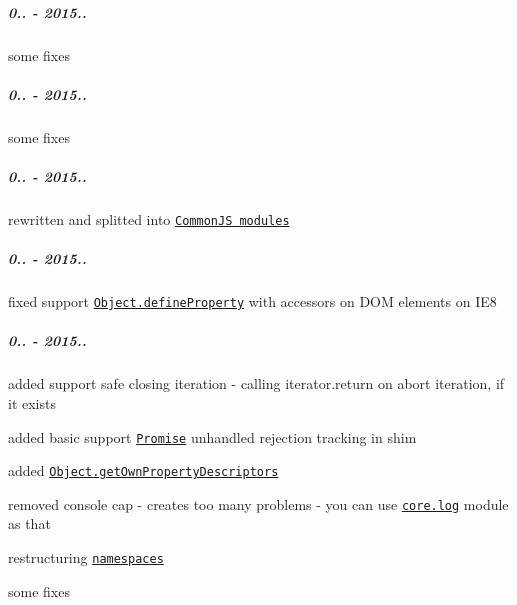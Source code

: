 \subparagraph*{0.. -\/ 2015..}


\begin{DoxyItemize}
\item some fixes
\end{DoxyItemize}

\subparagraph*{0.. -\/ 2015..}


\begin{DoxyItemize}
\item some fixes
\end{DoxyItemize}

\subparagraph*{0.. -\/ 2015..}


\begin{DoxyItemize}
\item rewritten and splitted into \href{https://github.com/zloirock/core-js/#commonjs}{\tt Common\+JS modules}
\end{DoxyItemize}

\subparagraph*{0.. -\/ 2015..}


\begin{DoxyItemize}
\item fixed support \href{https://github.com/zloirock/core-js/#ecmascript-5}{\tt {\ttfamily Object.\+define\+Property}} with accessors on D\+OM elements on I\+E8
\end{DoxyItemize}

\subparagraph*{0.. -\/ 2015..}


\begin{DoxyItemize}
\item added support safe closing iteration -\/ calling {\ttfamily iterator.\+return} on abort iteration, if it exists
\item added basic support \href{https://github.com/zloirock/core-js/#ecmascript-6-promise}{\tt {\ttfamily Promise}} unhandled rejection tracking in shim
\item added \href{https://github.com/zloirock/core-js/#ecmascript-7}{\tt {\ttfamily Object.\+get\+Own\+Property\+Descriptors}}
\item removed {\ttfamily console} cap -\/ creates too many problems -\/ you can use \href{https://github.com/zloirock/core-js/#console}{\tt {\ttfamily core.\+log}} module as that
\item restructuring \href{https://github.com/zloirock/core-js/#custom-build}{\tt namespaces}
\item some fixes
\end{DoxyItemize}

